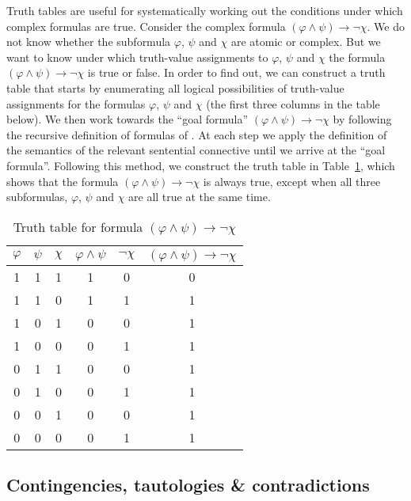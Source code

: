\documentclass[nobib,nofonts]{tufte-handout}
\newcommand{\proplog}{\acro{PropLog}}
\begin{document}
Truth tables are useful for systematically working out the conditions under which complex formulas are true.
Consider the complex formula $(\varphi \wedge \psi) \rightarrow \neg \chi$.
We do not know whether the subformula $\varphi$, $\psi$ and $\chi$ are atomic or complex.
But we want to know under which truth-value assignments to $\varphi$, $\psi$ and $\chi$ the formula $(\varphi \wedge \psi) \rightarrow \neg \chi$ is true or false.
In order to find out, we can construct a truth table that starts by enumerating all logical possibilities of truth-value assignments for the formulas $\varphi$, $\psi$ and $\chi$ (the first three columns in the table below).
We then work towards the ``goal formula'' $(\varphi \wedge \psi) \rightarrow \neg \chi$ by following the recursive definition of formulas of \mbox{\proplog}.
At each step we apply the definition of the semantics of the relevant sentential connective until we arrive at the ``goal formula''.
Following this method, we construct the truth table in Table~\ref{tab:truth-table-contingency}, which shows that the formula $(\varphi \wedge \psi) \rightarrow \neg \chi$ is always true, except when all three subformulas, $\varphi$, $\psi$ and $\chi$ are all true at the same time.

\begin{table}
  \centering
  \begin{center}
    \begin{tabular}{cccccc}
      $\varphi$ & $\psi$ & $\chi$ & $\varphi \wedge \psi$ & $\neg \chi$ & $(\varphi \wedge \psi) \rightarrow \neg \chi$ \\ \midrule
      1  & 1 & 1 & 1 & 0 & 0 \\
      1  & 1 & 0 & 1 & 1 & 1 \\
      1  & 0 & 1 & 0 & 0 & 1 \\
      1  & 0 & 0 & 0 & 1 & 1 \\
      0  & 1 & 1 & 0 & 0 & 1 \\
      0  & 1 & 0 & 0 & 1 & 1 \\
      0  & 0 & 1 & 0 & 0 & 1 \\
      0  & 0 & 0 & 0 & 1 & 1 \\
    \end{tabular}
  \end{center}

  \caption{Truth table for formula $(\varphi \wedge \psi) \rightarrow \neg \chi$}
  \label{tab:truth-table-contingency}
\end{table}

\subsection{Contingencies, tautologies \& contradictions}
\label{sec:cont-taut-}
\end{document}
